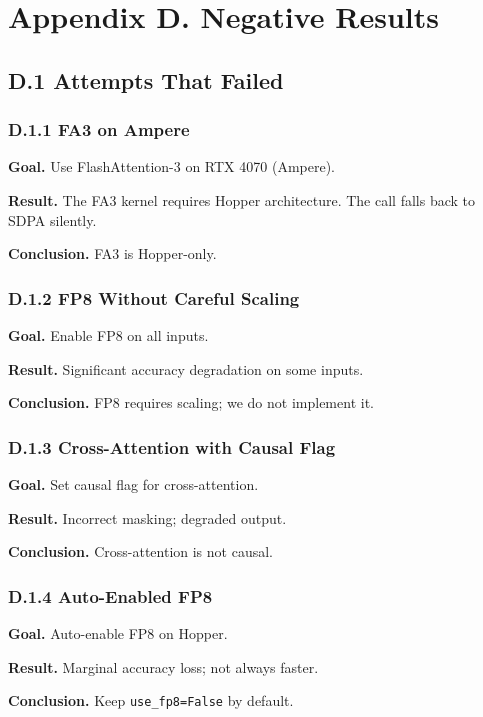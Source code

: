 \section{Appendix D. Negative Results}

\subsection{D.1 Attempts That Failed}

\subsubsection{D.1.1 FA3 on Ampere}

\textbf{Goal.} Use FlashAttention-3 on RTX 4070 (Ampere).

\textbf{Result.} The FA3 kernel requires Hopper architecture. The call falls 
back to SDPA silently.

\textbf{Conclusion.} FA3 is Hopper-only.

\subsubsection{D.1.2 FP8 Without Careful Scaling}

\textbf{Goal.} Enable FP8 on all inputs.

\textbf{Result.} Significant accuracy degradation on some inputs.

\textbf{Conclusion.} FP8 requires scaling; we do not implement it.

\subsubsection{D.1.3 Cross-Attention with Causal Flag}

\textbf{Goal.} Set causal flag for cross-attention.

\textbf{Result.} Incorrect masking; degraded output.

\textbf{Conclusion.} Cross-attention is not causal.

\subsubsection{D.1.4 Auto-Enabled FP8}

\textbf{Goal.} Auto-enable FP8 on Hopper.

\textbf{Result.} Marginal accuracy loss; not always faster.

\textbf{Conclusion.} Keep \texttt{use\_fp8=False} by default.

